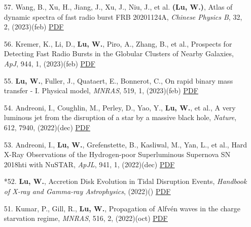 \begin{itemize}[leftmargin=0.65cm]
\vspace{-0.1cm}
\item[57.]{Wang, B., Xu, H., Jiang, J., Xu, J., Niu, J., et al. {\bf (Lu, W.)}, {Atlas of dynamic spectra of fast radio burst FRB 20201124A}, {\it Chinese Physics B}, 32, 2, (2023)(feb) \href{https://ui.adsabs.harvard.edu/abs/2023ChPhB..32b9801W}{\underline{PDF}}}

\vspace{-0.1cm}
\item[56.]{Kremer, K., Li, D., {\bf Lu, W.}, Piro, A., Zhang, B., et al., {Prospects for Detecting Fast Radio Bursts in the Globular Clusters of Nearby Galaxies}, {\it ApJ}, 944, 1, (2023)(feb) \href{https://ui.adsabs.harvard.edu/abs/2023ApJ...944....6K}{\underline{PDF}}}

\vspace{-0.1cm}
\item[55.]{{\bf Lu, W.}, Fuller, J., Quataert, E., Bonnerot, C., {On rapid binary mass transfer - I. Physical model}, {\it MNRAS}, 519, 1, (2023)(feb) \href{https://ui.adsabs.harvard.edu/abs/2023MNRAS.519.1409L}{\underline{PDF}}}

\vspace{-0.1cm}
\item[54.]{Andreoni, I., Coughlin, M., Perley, D., Yao, Y., {\bf Lu, W.}, et al., {A very luminous jet from the disruption of a star by a massive black hole}, {\it Nature}, 612, 7940, (2022)(dec) \href{https://ui.adsabs.harvard.edu/abs/2022Natur.612..430A}{\underline{PDF}}}

\vspace{-0.1cm}
\item[53.]{Andreoni, I., {\bf Lu, W.}, Grefenstette, B., Kasliwal, M., Yan, L., et al., {Hard X-Ray Observations of the Hydrogen-poor Superluminous Supernova SN 2018hti with NuSTAR}, {\it ApJL}, 941, 1, (2022)(dec) \href{https://ui.adsabs.harvard.edu/abs/2022ApJ...941L..16A}{\underline{PDF}}}

\vspace{-0.1cm}
\item[*52.]{{\bf Lu, W.}, {Accretion Disk Evolution in Tidal Disruption Events}, {\it Handbook of X-ray and Gamma-ray Astrophysics}, (2022)() \href{https://ui.adsabs.harvard.edu/abs/2022hxga.book....3L}{\underline{PDF}}}

\vspace{-0.1cm}
\item[51.]{Kumar, P., Gill, R., {\bf Lu, W.}, {Propagation of Alfv{\'e}n waves in the charge starvation regime}, {\it MNRAS}, 516, 2, (2022)(oct) \href{https://ui.adsabs.harvard.edu/abs/2022MNRAS.516.2697K}{\underline{PDF}}}


\end{itemize}
